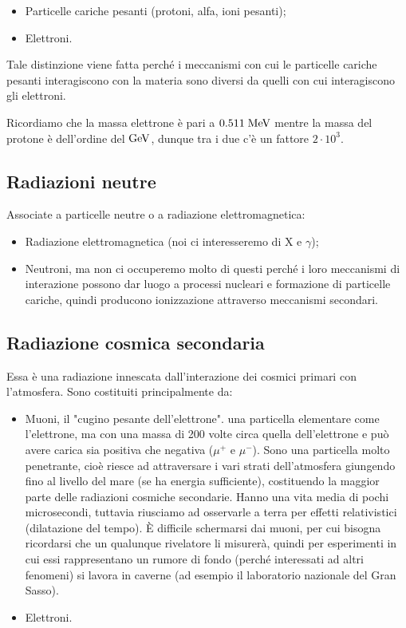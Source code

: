 \begin{itemize}
    \item Particelle cariche pesanti (protoni, alfa, ioni pesanti);
    \item Elettroni.
\end{itemize}

Tale distinzione viene fatta perché i meccanismi con cui le particelle cariche pesanti interagiscono con la materia sono diversi da quelli con cui interagiscono gli elettroni.

Ricordiamo che la massa elettrone è pari a $0.511 \; \rm MeV$ mentre la massa del protone è dell'ordine del $\rm GeV$, dunque tra i due c'è un fattore $2 \cdot 10^3$.

\subsection{Radiazioni neutre}
Associate a particelle neutre o a radiazione elettromagnetica:

\begin{itemize}
    \item Radiazione elettromagnetica (noi ci interesseremo di X e $\gamma$);
    \item Neutroni, ma non ci occuperemo molto di questi perché i loro meccanismi di interazione possono dar luogo a processi nucleari e formazione di particelle cariche, quindi producono ionizzazione attraverso meccanismi secondari.
\end{itemize}

\subsection{Radiazione cosmica secondaria}
Essa è una radiazione innescata dall'interazione dei cosmici primari con l'atmosfera. Sono costituiti principalmente da:

\begin{itemize}
    \item Muoni, il "cugino pesante dell'elettrone". \E una particella elementare come l'elettrone, ma con una massa di 200 volte circa quella dell'elettrone e può avere carica sia positiva che negativa ($\mu^{+}$ e $\mu^{-}$). Sono una particella molto penetrante, cioè riesce ad attraversare i vari strati dell'atmosfera giungendo fino al livello del mare (se ha energia sufficiente), costituendo la maggior parte delle radiazioni cosmiche secondarie. Hanno una vita media di pochi microsecondi, tuttavia riusciamo ad osservarle a terra per effetti relativistici (dilatazione del tempo). È difficile schermarsi dai muoni, per cui bisogna ricordarsi che un qualunque rivelatore li misurerà, quindi per esperimenti in cui essi rappresentano un rumore di fondo (perché interessati ad altri fenomeni) si lavora in caverne (ad esempio il laboratorio nazionale del Gran Sasso).
    \item Elettroni.
\end{itemize}

